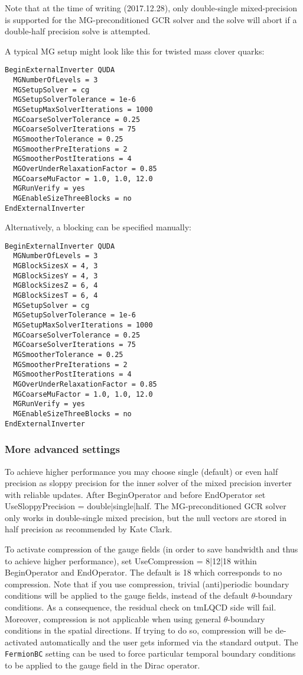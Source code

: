 Note that at the time of writing (2017.12.28), only double-single mixed-precision is supported for the MG-preconditioned GCR solver and the solve will abort if a double-half precision solve is attempted.

A typical MG setup might look like this for twisted mass clover quarks: 

\begin{verbatim}
BeginExternalInverter QUDA
  MGNumberOfLevels = 3
  MGSetupSolver = cg
  MGSetupSolverTolerance = 1e-6
  MGSetupMaxSolverIterations = 1000
  MGCoarseSolverTolerance = 0.25
  MGCoarseSolverIterations = 75
  MGSmootherTolerance = 0.25
  MGSmootherPreIterations = 2
  MGSmootherPostIterations = 4
  MGOverUnderRelaxationFactor = 0.85
  MGCoarseMuFactor = 1.0, 1.0, 12.0
  MGRunVerify = yes
  MGEnableSizeThreeBlocks = no
EndExternalInverter
\end{verbatim}

Alternatively, a blocking can be specified manually:

\begin{verbatim}
BeginExternalInverter QUDA
  MGNumberOfLevels = 3
  MGBlockSizesX = 4, 3
  MGBlockSizesY = 4, 3
  MGBlockSizesZ = 6, 4
  MGBlockSizesT = 6, 4
  MGSetupSolver = cg
  MGSetupSolverTolerance = 1e-6
  MGSetupMaxSolverIterations = 1000
  MGCoarseSolverTolerance = 0.25
  MGCoarseSolverIterations = 75
  MGSmootherTolerance = 0.25
  MGSmootherPreIterations = 2
  MGSmootherPostIterations = 4
  MGOverUnderRelaxationFactor = 0.85
  MGCoarseMuFactor = 1.0, 1.0, 12.0
  MGRunVerify = yes
  MGEnableSizeThreeBlocks = no
EndExternalInverter
\end{verbatim}

\subsubsection{More advanced settings}
To achieve higher performance you may choose single (default) or even half precision as sloppy precision for the inner solver of the mixed precision inverter with reliable updates. After {\ttfamily BeginOperator} and before {\ttfamily EndOperator} set {\ttfamily UseSloppyPrecision = double|single|half}.
The MG-preconditioned GCR solver only works in double-single mixed precision, but the null vectors are stored in half precision as recommended by Kate Clark.

To activate compression of the gauge fields (in order to save bandwidth and thus to achieve higher performance), set {\ttfamily UseCompression = 8|12|18} within {\ttfamily BeginOperator} and {\ttfamily EndOperator}. 
The default is 18 which corresponds to no compression. 
Note that if you use compression, trivial (anti)periodic boundary conditions will be applied to the gauge fields, instead of the default $\theta$-boundary conditions. 
As a consequence, the residual check on tmLQCD side will fail. 
Moreover, compression is not applicable when using general $\theta$-boundary conditions in the spatial directions. 
If trying to do so, compression will be de-activated automatically and the user gets informed via the standard output.
The \texttt{FermionBC} setting can be used to force particular temporal boundary conditions to be applied to the gauge field in the Dirac operator.

